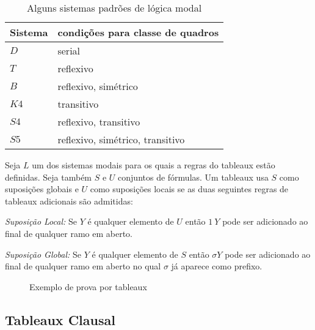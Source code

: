 \begin{table}
    \begin{center}
        \label{table:condicoes_quadro}
        \caption{Alguns sistemas padrões de lógica modal}
        \begin{tabular}{ll}
            \hline
            Sistema & condições para classe de quadros \\
            \hline
            $D$  & serial \\ 
            $T$  & reflexivo \\ 
            $B$  & reflexivo, simétrico\\ 
            $K4$ & transitivo \\  
            $S4$ & reflexivo, transitivo \\  
            $S5$ & reflexivo, simétrico, transitivo \\
            \hline
        \end{tabular}
    \end{center}
\end{table}

\begin{definition}
    Seja $L$ um dos sistemas modais para os quais a regras do tableaux estão
    definidas. Seja também $S$ e $U$ conjuntos de fórmulas. Um tableaux usa $S$
    como suposições globais e $U$ como suposições locais se as duas seguintes
    regras de tableaux adicionais são admitidas:

    \textit{Suposição Local:} Se $Y$ é qualquer elemento de $U$ então $1\ Y$ pode
    ser adicionado ao final de qualquer ramo em aberto.

    \textit{Suposição Global:} Se $Y$ é qualquer elemento de $S$ então $\sigma Y$
    pode ser adicionado ao final de qualquer ramo em aberto no qual $\sigma$ já
    aparece como prefixo.
\end{definition}


\begin{figure}
    \label{fig:example2}
    \begin{center}
    \end{center}
    \caption{Exemplo de prova por tableaux}
\end{figure}

\subsection{Tableaux Clausal}
